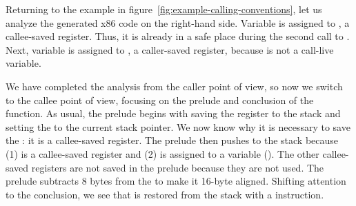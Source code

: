 \documentclass[7x10]{TimesAPriori_MIT}%
\numberwithin{theorem}{chapter}
\numberwithin{definition}{chapter}
\numberwithin{equation}{chapter}
\begin{document}
Returning to the example in
figure~\ref{fig:example-calling-conventions}, let us analyze the
generated x86 code on the right-hand side. Variable  is
assigned to , a callee-saved register. Thus, it is already
in a safe place during the second call to . Next,
variable  is assigned to , a caller-saved register,
because  is not a call-live variable.

We have completed the analysis from the caller point of view, so now
we switch to the callee point of view, focusing on the prelude and
conclusion of the  function. As usual, the prelude begins
with saving the  register to the stack and setting the
 to the current stack pointer. We now know why it is
necessary to save the : it is a callee-saved register.  The
prelude then pushes  to the stack because (1)  is
a callee-saved register and (2)  is assigned to a variable
(). The other callee-saved registers are not saved in the
prelude because they are not used. The prelude subtracts 8 bytes from
the  to make it 16-byte aligned. Shifting attention to the
conclusion, we see that  is restored from the stack with a
 instruction.
\end{document}

